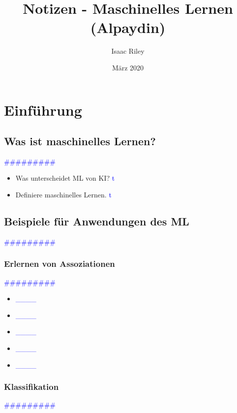 \documentclass{article}
\title{Notizen - Maschinelles Lernen (Alpaydin)}
\author{Isaac Riley}
\date{März 2020}
\begin{document}
\maketitle

\section{Einführung} %
  \subsection{Was ist maschinelles Lernen?} %
      \textcolor{blue}{\#\#\#\#\#\#\#\#\#}
            \begin{itemize}
            \color{red}
              \item Was unterscheidet ML von KI? \textcolor{blue}{t}
            \color{ForestGreen}
              \item Definiere maschinelles Lernen. \textcolor{blue}{t}
            \end{itemize}
  \subsection{Beispiele für Anwendungen des ML} %
      \textcolor{blue}{\#\#\#\#\#\#\#\#\#}
    \subsubsection{Erlernen von Assoziationen} %
      \textcolor{blue}{\#\#\#\#\#\#\#\#\#}

      \begin{itemize}
      \color{red}
        \item  \textcolor{blue}{\_\_\_\_}
        \item  \textcolor{blue}{\_\_\_\_}
      \color{ForestGreen}
        \item  \textcolor{blue}{\_\_\_\_}
        \item  \textcolor{blue}{\_\_\_\_}
        \item  \textcolor{blue}{\_\_\_\_}
      \end{itemize}

    \subsubsection{Klassifikation} %
      \textcolor{blue}{\#\#\#\#\#\#\#\#\#}
\end{document}
